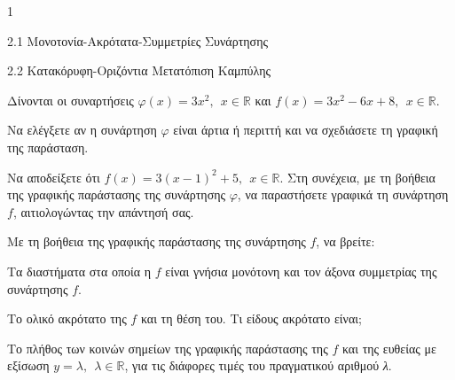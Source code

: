 \begin{ylh}{1}
\item 2.1 Μονοτονία-Ακρότατα-Συμμετρίες Συνάρτησης
\item 2.2 Κατακόρυφη-Οριζόντια Μετατόπιση Καμπύλης
\end{ylh}
Δίνονται οι συναρτήσεις $\varphi(x) = 3x^{2},\ \ x \in \mathbb{R}$ και $f(x) = 3x^{2} - 6x + 8,\ \ x\mathbb{\in R}.$
\begin{alist}
\item Να ελέγξετε αν η συνάρτηση $\varphi$ είναι άρτια ή περιττή και να σχεδιάσετε τη γραφική της παράσταση.
\item Να αποδείξετε ότι $f(x) = 3(x - 1)^{2} + 5,\ \ x\mathbb{\in R}.$ Στη συνέχεια, με τη βοήθεια της γραφικής παράστασης της συνάρτησης $\varphi$, να παραστήσετε γραφικά τη συνάρτηση $f$, αιτιολογώντας την απάντησή σας.
\item Με τη βοήθεια της γραφικής παράστασης της συνάρτησης $f$, να βρείτε:
\end{alist}
\begin{alist}
\item
  Τα διαστήματα στα οποία η $f$ είναι γνήσια μονότονη και τον άξονα συμμετρίας της συνάρτησης $f.$
\end{alist}
\begin{alist}
\item
  Το ολικό ακρότατο της $f$ και τη θέση του. Τι είδους ακρότατο είναι;
\end{alist}
\begin{alist}
\item
  Το πλήθος των κοινών σημείων της γραφικής παράστασης της $f$ και της ευθείας με εξίσωση $y = \lambda,\ \ \lambda\mathbb{\in R}$, για τις διάφορες τιμές του πραγματικού αριθμού \emph{λ}.
\end{alist}

